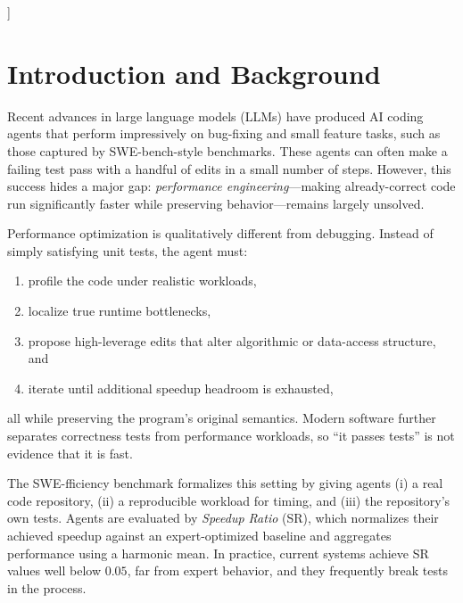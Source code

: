 \documentclass{article}
\theoremstyle{plain}
\theoremstyle{definition}
\theoremstyle{remark}
\begin{document}
  \vskip 0.3in
]

\printAffiliationsAndNotice{}  %

\section{Introduction and Background}
\label{sec:intro}
Recent advances in large language models (LLMs) have produced AI coding agents that perform impressively on bug-fixing and small feature tasks, such as those captured by SWE-bench-style benchmarks. These agents can often make a failing test pass with a handful of edits in a small number of steps. However, this success hides a major gap: \emph{performance engineering}---making already-correct code run significantly faster while preserving behavior---remains largely unsolved.

Performance optimization is qualitatively different from debugging. Instead of simply satisfying unit tests, the agent must:
\begin{enumerate}
    \item profile the code under realistic workloads,
    \item localize true runtime bottlenecks,
    \item propose high-leverage edits that alter algorithmic or data-access structure, and
    \item iterate until additional speedup headroom is exhausted,
\end{enumerate}
all while preserving the program's original semantics. Modern software further separates correctness tests from performance workloads, so ``it passes tests'' is not evidence that it is fast.

The SWE-fficiency benchmark formalizes this setting by giving agents (i) a real code repository, (ii) a reproducible workload for timing, and (iii) the repository's own tests. Agents are evaluated by \emph{Speedup Ratio} (SR), which normalizes their achieved speedup against an expert-optimized baseline and aggregates performance using a harmonic mean. In practice, current systems achieve SR values well below $0.05$, far from expert behavior, and they frequently break tests in the process.
\end{document}

